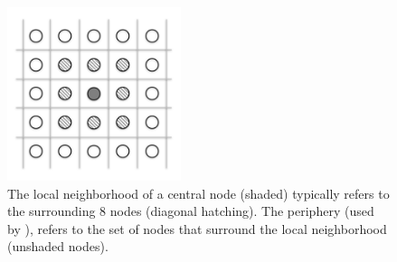 \documentclass[gmdd, hvmath]{copernicus}
\begin{document}
\begin{figure}
\begin{center}
\includegraphics[width=2in]{LocalNodeTypes.pdf}
\end{center}
\caption{The local neighborhood of a central node (shaded) typically refers to the surrounding 8 nodes (diagonal hatching).  The periphery (used by \cite{tsutsui1996simulated}), refers to the set of nodes that surround the local neighborhood (unshaded nodes).} \label{fig:LocalNodeTypes}
\end{figure}
\end{document}
